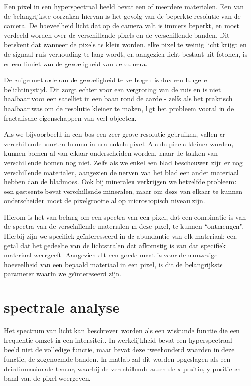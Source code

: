 \documentclass[12pt]{report}
\begin{document}
Een pixel in een hyperspectraal beeld bevat een of meerdere materialen. Een van de belangrijkste oorzaken hiervan is het gevolg van de beperkte resolutie van de camera. De hoeveelheid licht dat op de camera valt is immers beperkt, en moet verdeeld worden over de verschillende pixels en de verschillende banden. Dit betekent dat wanneer de pixels te klein worden, elke pixel te weinig licht krijgt en de signaal ruis verhouding te laag wordt, en aangezien licht bestaat uit fotonen, is er een limiet van de gevoeligheid van de camera. 

De enige methode om de gevoeligheid te verhogen is dus een langere belichtingstijd. Dit zorgt echter voor een vergroting van de ruis en is niet haalbaar voor een satelliet in een baan rond de aarde - zelfs als het praktisch haalbaar was om de resolutie kleiner te maken, ligt het probleem vooral in de fractalische eigenschappen van veel objecten. 

Als we bijvoorbeeld in een bos een zeer grove resolutie gebruiken, vallen er verschillende soorten bomen in een enkele pixel. Als de pixels kleiner worden, kunnen bomen al van elkaar onderscheiden worden, maar de takken van verschillende bomen nog niet. Zelfs als we enkel een blad beschouwen zijn er nog verschillende materialen, aangezien de nerven van het blad een ander materiaal hebben dan de bladmoes. Ook bij mineralen verkrijgen we hetzelfde probleem: een gesteente bevat verschillende mineralen, maar om deze van elkaar te kunnen onderscheiden moet de pixelgrootte al op microscopisch niveau zijn. 

Hierom is het van belang om een spectra van een pixel, dat een combinatie is van de spectra van de verschillende materialen in deze pixel, te kunnen ``ontmengen''. Hierbij zijn we specifiek ge\"interesseerd in de abundantie van elk materiaal: een getal dat het gedeelte van de lichtstralen dat afkomstig is van dat specifiek materiaal weergeeft. Aangezien dit een goede maat is voor de aanwezige hoeveelheid van een bepaald materiaal in een pixel, is dit de belangrijkste parameter waarin we ge\"intereseerd zijn.


\section{spectrale analyse}


Het spectrum van licht kan beschreven worden als een wiskunde functie die een frequentie omzet in een intensiteit. In werkelijkheid bevat een hyperspectraal beeld niet de volledige functie, maar bevat deze tweehonderd waarden in deze functie, de zogenoemde banden. In matlab\citep{MATLAB} zal dit worden opgeslagen als een driedimensionale tensor, waarbij de verschillende assen de x positie, y positie en band van de pixel weergeven. 
\end{document}
